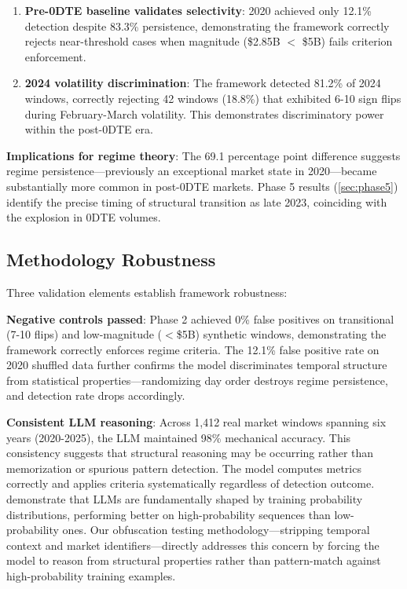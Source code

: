 \vspace{0.1cm}

\begin{enumerate}
\item \textbf{Pre-0DTE baseline validates selectivity}: 2020 achieved only 12.1\% detection despite 83.3\% persistence, demonstrating the framework correctly rejects near-threshold cases when magnitude (\$2.85B $<$ \$5B) fails criterion enforcement.

\item \textbf{2024 volatility discrimination}: The framework detected 81.2\% of 2024 windows, correctly rejecting 42 windows (18.8\%) that exhibited 6-10 sign flips during February-March volatility. This demonstrates discriminatory power within the post-0DTE era.
\end{enumerate}

\vspace{0.2cm}

\noindent\textbf{Implications for regime theory}: The 69.1 percentage point difference suggests regime persistence—previously an exceptional market state in 2020—became substantially more common in post-0DTE markets. Phase 5 results (\ref{sec:phase5}) identify the precise timing of structural transition as late 2023, coinciding with the explosion in 0DTE volumes.

\subsection{Methodology Robustness}

\vspace{0.2cm}

Three validation elements establish framework robustness:

\vspace{0.2cm}

\noindent\textbf{Negative controls passed}: Phase 2 achieved 0\% false positives on transitional (7-10 flips) and low-magnitude ($<$\$5B) synthetic windows, demonstrating the framework correctly enforces regime criteria. The 12.1\% false positive rate on 2020 shuffled data further confirms the model discriminates temporal structure from statistical properties—randomizing day order destroys regime persistence, and detection rate drops accordingly.

\vspace{0.2cm}

\noindent\textbf{Consistent LLM reasoning}: Across 1,412 real market windows spanning six years (2020-2025), the LLM maintained 98\% mechanical accuracy. This consistency suggests that structural reasoning may be occurring rather than memorization or spurious pattern detection. The model computes metrics correctly and applies criteria systematically regardless of detection outcome. \citet{mccoy2023embers} demonstrate that LLMs are fundamentally shaped by training probability distributions, performing better on high-probability sequences than low-probability ones. Our obfuscation testing methodology—stripping temporal context and market identifiers—directly addresses this concern by forcing the model to reason from structural properties rather than pattern-match against high-probability training examples.

